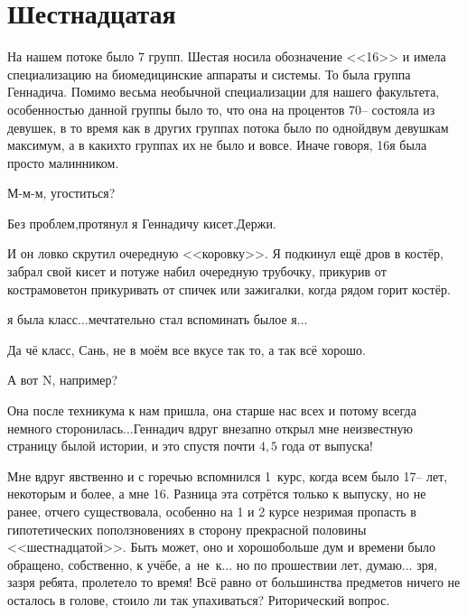 \newpage
\section*{Шестнадцатая}

На нашем потоке было 7 групп. Шестая носила обозначение <<16>> и имела специализацию на биомедицинские аппараты и системы. То была группа Геннадича. Помимо весьма необычной специализации для нашего факультета, особенностью данной группы было то, что она на процентов 70\thinspace\nobreakdash-- состояла из девушек, в то время как в других группах потока было по одной\sdash двум девушкам максимум, а в каких\sdash то группах их не было и вовсе. Иначе говоря, 16\sdash я была просто малинником.


\diagdash М-м-м, угоститься?

\diagdash Без проблем,\mdash протянул я Геннадичу кисет.\mdash Держи.

И он ловко скрутил очередную <<коровку>>. Я подкинул ещё дров в костёр, забрал свой кисет и потуже набил очередную трубочку, прикурив от костра\mdash моветон прикуривать от спичек или зажигалки, когда рядом горит костёр.

\sdash я была класс$\ldots$\mdash мечтательно стал вспоминать былое я$\ldots$

\diagdash Да чё класс, Сань, не в моём все вкусе так то, а так всё хорошо.

\diagdash А вот N, например? 

\diagdash Она после техникума к нам пришла, она старше нас всех и потому всегда немного сторонилась$\ldots$\mdash Геннадич вдруг внезапно открыл мне неизвестную страницу былой истории, и это спустя почти $4,5$ года от выпуска!

Мне вдруг явственно и с горечью вспомнился 1~курс, когда всем было 17\thinspace\nobreakdash-- лет, некоторым и более, а мне 16. Разница эта сотрётся только к выпуску, но не ранее, отчего существовала, особенно на 1 и 2 курсе незримая пропасть в гипотетических поползновениях в сторону прекрасной половины <<шестнадцатой>>. Быть может, оно и хорошо\mdash больше дум и времени было обращено, собственно, к учёбе, а~не~к$\ldots$ но по прошествии лет, думаю$\ldots$ зря, зазря ребята, пролетело то время! Всё равно от большинства предметов ничего не осталось в голове, стоило ли так упахиваться? Риторический вопрос.

